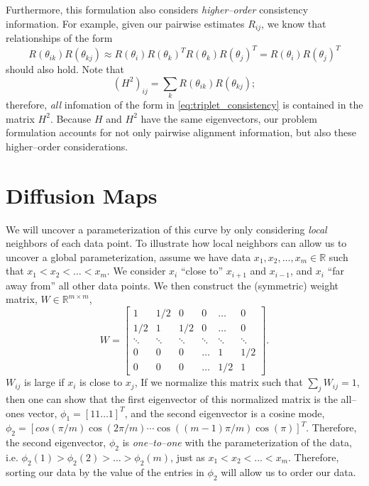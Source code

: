 \documentclass{pnastwo}
\begin{document}
\begin{article}
\begin{materials}
Furthermore, this formulation also considers {\em higher--order} consistency information. 
%
For example, given our pairwise estimates $R_{ij}$, we know that relationships of the form
\begin{equation} \label{eq:triplet_consistency}
R(\theta_{ik}) R(\theta_{kj}) \approx R(\theta_i) R(\theta_k)^T R(\theta_k) R(\theta_j)^T = R(\theta_i) R(\theta_j)^T
\end{equation}
should also hold.
%
Note that
\begin{equation}
(H^2)_{ij} = \sum_k R(\theta_{ik}) R(\theta_{kj});
\end{equation}
therefore, {\em all} infomation of the form in \eqref{eq:triplet_consistency} is contained in the matrix $H^2$.
%
Because $H$ and $H^2$ have the same eigenvectors, our problem formulation accounts for not only pairwise alignment information, but also these higher--order considerations. 

\section{Diffusion Maps}

We will uncover a parameterization of this curve by only considering {\em local} neighbors of each data point.
%
To illustrate how local neighbors can allow us to uncover a global parameterization, assume we have data $x_1, x_2, \dots, x_m \in \mathbb{R}$ such that $x_1 < x_2 < \dots < x_m$.
%
We consider $x_i$ ``close to'' $x_{i+1}$ and $x_{i-1}$, and $x_i$ ``far away from'' all other data points. 
%
We then construct the (symmetric) weight matrix, $W \in \mathbb{R}^{m \times m}$,
\begin{equation}
W = 
\begin{bmatrix}
	1 & 1/2 & 0 & 0 & \dots & 0 \\
	1/2 & 1 & 1/2 & 0 & \dots & 0 \\
	\ddots & \ddots & \ddots & \ddots & \ddots & \ddots \\
	0 & 0 & 0 & \dots & 1 & 1/2 \\
	0 & 0 & 0 & \dots & 1/2 & 1 
\end{bmatrix}.
\end{equation}
%
$W_{ij}$ is large if $x_i$ is close to $x_j$,
%
If we normalize this matrix such that $\sum_j W_{ij} = 1$, then one can show that the first eigenvector of this normalized matrix is the all--ones vector, $\phi_1 = [1 1 \dots 1]^T$, and the second eigenvector is a cosine mode, $\phi_2 = [cos(\pi/m) \cos(2 \pi/ m) \cdots \cos((m-1) \pi / m) \cos(\pi)]^T$.
%
Therefore, the second eigenvector, $\phi_2$ is {\em one--to--one} with the parameterization of the data, i.e. $\phi_2(1) > \phi_2(2) > \dots > \phi_2(m)$, just as $x_1 < x_2 < \dots < x_m$. 
%
Therefore, sorting our data by the value of the entries in $\phi_2$ will allow us to order our data.


\end{materials}
\end{article}
\end{document}
